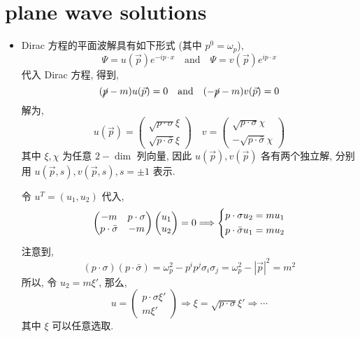 \section{plane wave solutions}
\begin{itemize}
	\item Dirac 方程的平面波解具有如下形式 (其中 $p^0 = \omega_p$),
	\begin{equation}
		\Psi = u(\vec{p}) e^{- i p \cdot x} \quad \text{and} \quad \Psi = v(\vec{p}) e^{i p \cdot x}
	\end{equation}
	代入 Dirac 方程, 得到,
	\begin{equation}
		(\cancel{p} - m) u(\vec{p}) = 0 \quad \text{and} \quad (- \cancel{p} - m) v(\vec{p}) = 0
	\end{equation}
	解为,
	\begin{equation}
		u(\vec{p}) = \begin{pmatrix}
			\sqrt{p \cdot \sigma} \xi \\
			\sqrt{p \cdot \bar{\sigma}} \xi
		\end{pmatrix} \quad v = \begin{pmatrix}
			\sqrt{p \cdot \sigma} \chi \\
			- \sqrt{p \cdot \bar{\sigma}} \chi
		\end{pmatrix}
	\end{equation}
	其中 $\xi, \chi$ 为任意 $2-\dim$ 列向量, 因此 $u(\vec{p}), v(\vec{p})$ 各有两个独立解, 分别用 $u(\vec{p}, s), v(\vec{p}, s), s = \pm 1$ 表示.
	
	\begin{tcolorbox}[title=proof:]
		令 $u^T = (u_1, u_2)$ 代入,
		\begin{equation}
			\begin{pmatrix}
				- m & p \cdot \sigma \\
				p \cdot \bar{\sigma} & - m
			\end{pmatrix} \begin{pmatrix}
				u_1 \\
				u_2
			\end{pmatrix} = 0 \Longrightarrow \begin{dcases}
				p \cdot \sigma u_2 = m u_1 \\
				p \cdot \bar{\sigma} u_1 = m u_2
			\end{dcases}
		\end{equation}
		注意到,
		\begin{equation}
			(p \cdot \sigma) (p \cdot \bar{\sigma}) = \omega_p^2 - p^i p^j \sigma_i \sigma_j = \omega_p^2 - |\vec{p}|^2 = m^2
		\end{equation}
		所以, 令 $u_2 = m \xi'$, 那么,
		\begin{equation}
			u = \begin{pmatrix}
				p \cdot \sigma \xi' \\
				m \xi'
			\end{pmatrix} \Longrightarrow \xi = \sqrt{p \cdot \sigma} \xi' \Longrightarrow \cdots
		\end{equation}
		其中 $\xi$ 可以任意选取.
		

\end{tcolorbox}
\end{itemize}
